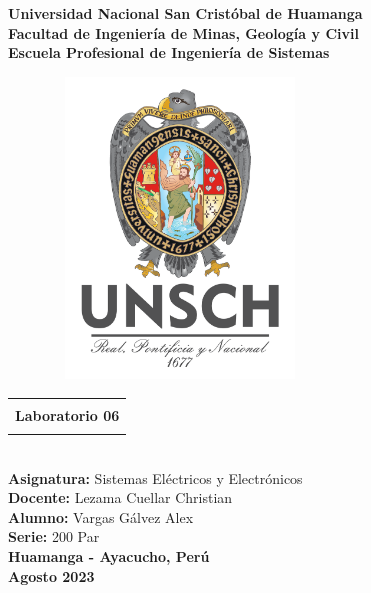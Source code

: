 \begin{titlepage}
	\begin{center}
		{\LARGE\textbf{Universidad Nacional San Cristóbal de Huamanga}}\\
		\vspace{0.5cm}
		{\LARGE\textbf{Facultad de Ingeniería de Minas, Geología y Civil}}\\
		\vspace{0.5cm}
		{\LARGE\textbf{Escuela Profesional de Ingeniería de Sistemas}}\\
		\vspace{1cm}
		\begin{figure}[h]
			\centering
			\includegraphics[width=7cm, height=8cm]{imagenes/logo}
		\end{figure}
		\vspace{0.75cm}
		\begin{tabular}{|c|}
			\hline
			\\
			{\Large\textbf{ Laboratorio 06  }}\\
			\\
			\hline
		\end{tabular}\\
		\vspace{0.75cm}
		{\Large\textbf{Asignatura: }Sistemas Eléctricos y Electrónicos}\\
		\vspace{0.75cm}
		{\Large\textbf{Docente: }Lezama Cuellar Christian}\\
		\vspace{0.75cm}
		{\Large\textbf{Alumno: }Vargas Gálvez Alex}\\
		\vspace{0.75cm}
		{\large\textbf{Serie: }200 Par}\\
		\vspace{ 1.5cm}
		{\huge \textbf{Huamanga - Ayacucho, Perú}}\\
		\vspace{1cm}
		{\huge \textbf{Agosto 2023}}
	\end{center}
\end{titlepage}
